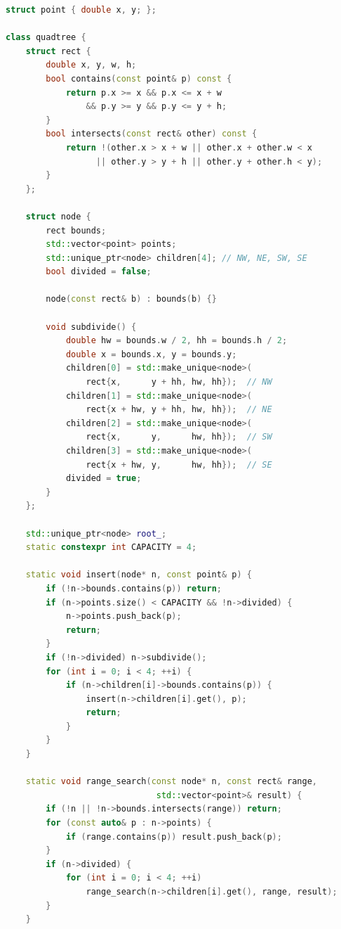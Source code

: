 \begin{lstlisting}[language=C++]
struct point { double x, y; };

class quadtree {
    struct rect {
        double x, y, w, h;
        bool contains(const point& p) const {
            return p.x >= x && p.x <= x + w
                && p.y >= y && p.y <= y + h;
        }
        bool intersects(const rect& other) const {
            return !(other.x > x + w || other.x + other.w < x
                  || other.y > y + h || other.y + other.h < y);
        }
    };

    struct node {
        rect bounds;
        std::vector<point> points;
        std::unique_ptr<node> children[4]; // NW, NE, SW, SE
        bool divided = false;

        node(const rect& b) : bounds(b) {}

        void subdivide() {
            double hw = bounds.w / 2, hh = bounds.h / 2;
            double x = bounds.x, y = bounds.y;
            children[0] = std::make_unique<node>(
                rect{x,      y + hh, hw, hh});  // NW
            children[1] = std::make_unique<node>(
                rect{x + hw, y + hh, hw, hh});  // NE
            children[2] = std::make_unique<node>(
                rect{x,      y,      hw, hh});  // SW
            children[3] = std::make_unique<node>(
                rect{x + hw, y,      hw, hh});  // SE
            divided = true;
        }
    };

    std::unique_ptr<node> root_;
    static constexpr int CAPACITY = 4;

    static void insert(node* n, const point& p) {
        if (!n->bounds.contains(p)) return;
        if (n->points.size() < CAPACITY && !n->divided) {
            n->points.push_back(p);
            return;
        }
        if (!n->divided) n->subdivide();
        for (int i = 0; i < 4; ++i) {
            if (n->children[i]->bounds.contains(p)) {
                insert(n->children[i].get(), p);
                return;
            }
        }
    }

    static void range_search(const node* n, const rect& range,
                              std::vector<point>& result) {
        if (!n || !n->bounds.intersects(range)) return;
        for (const auto& p : n->points) {
            if (range.contains(p)) result.push_back(p);
        }
        if (n->divided) {
            for (int i = 0; i < 4; ++i)
                range_search(n->children[i].get(), range, result);
        }
    }


\end{lstlisting}
